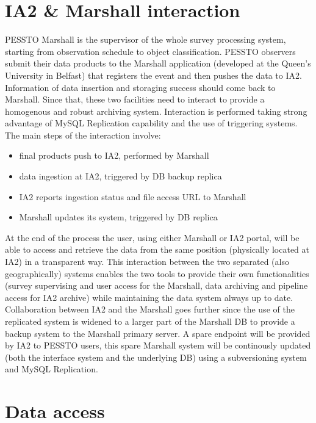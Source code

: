 \section{IA2 \& Marshall interaction}\label{ia2marshall}

PESSTO Marshall is the supervisor of the whole survey processing system, starting from observation schedule to object classification. PESSTO observers submit their data products to the Marshall application (developed at the Queen's University in Belfast) that registers the event and then pushes the data to IA2. Information of data insertion and storaging success should come back to Marshall. Since that, these two facilities need to interact to provide a homogenous and robust archiving system.
Interaction is performed taking strong advantage of MySQL Replication capability and the use of triggering systems. The main steps of the interaction involve:
\begin{itemize}[noitemsep,nolistsep]
	\item final products push to IA2, performed by Marshall
	\item data ingestion at IA2, triggered by DB backup replica
	\item IA2 reports ingestion status and file access URL to Marshall
	\item Marshall updates its system, triggered by DB replica
\end{itemize} 
At the end of the process the user, using either Marshall or IA2 portal, will be able to access and retrieve the data from the same position (physically located at IA2) in a transparent way.
This interaction between the two separated (also geographically) systems enables the two tools to provide their own functionalities (survey supervising and user access for the Marshall, data archiving and pipeline access for IA2 archive) while maintaining the data system always up to date.
Collaboration between IA2 and the Marshall goes further since the use of the replicated system is widened to a larger part of the Marshall DB to provide a backup system to the Marshall primary server. A spare endpoint will be provided by IA2 to PESSTO users, this spare Marshall system will be continously updated (both the interface system and the underlying DB) using a subversioning system and MySQL Replication.

\section{Data access}\label{dataaccess}

